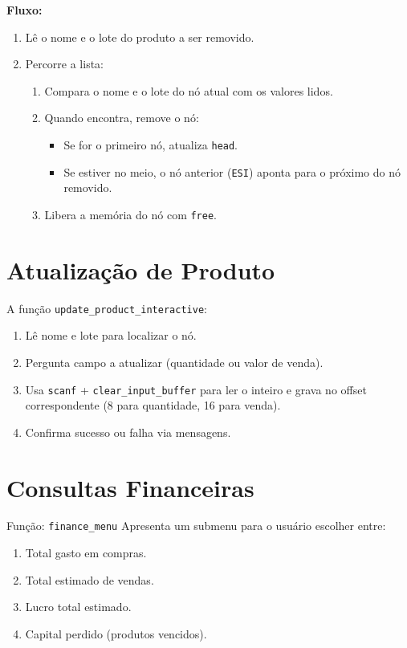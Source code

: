 \documentclass[12pt]{article}
\begin{document}
\textbf{Fluxo:}
\begin{enumerate}
    \item Lê o nome e o lote do produto a ser removido.
    \item Percorre a lista:
        \begin{enumerate}
            \item Compara o nome e o lote do nó atual com os valores lidos.
            \item Quando encontra, remove o nó:
                \begin{itemize}
                    \item Se for o primeiro nó, atualiza \texttt{head}.
                    \item Se estiver no meio, o nó anterior (\texttt{ESI}) aponta para o próximo do nó removido.
                \end{itemize}
            \item Libera a memória do nó com \texttt{free}.
        \end{enumerate}
\end{enumerate}


\section{Atualização de Produto}
A função \texttt{update\_product\_interactive}:
\begin{enumerate}
  \item Lê nome e lote para localizar o nó.
  \item Pergunta campo a atualizar (quantidade ou valor de venda).
  \item Usa \texttt{scanf} + \texttt{clear\_input\_buffer} para ler o inteiro e grava no offset correspondente (8 para quantidade, 16 para venda).
  \item Confirma sucesso ou falha via mensagens.
\end{enumerate}

\section{Consultas Financeiras}
Função: \texttt{finance\_menu}
Apresenta um submenu para o usuário escolher entre:
\begin{enumerate}
    \item Total gasto em compras.
    \item Total estimado de vendas.
    \item Lucro total estimado.
    \item Capital perdido (produtos vencidos).
\end{enumerate}
\end{document}
